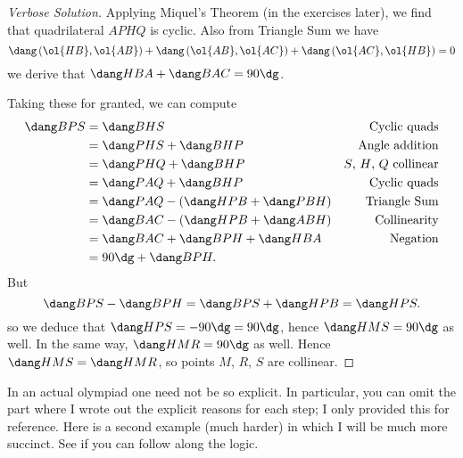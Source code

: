 \documentclass[11pt]{scrartcl}
\begin{document}
\begin{proof}
  [Verbose Solution]
  Applying Miquel's Theorem (in the exercises later),
  we find that quadrilateral $APHQ$ is cyclic.
  Also from Triangle Sum we have
  \[ \dang \left( \ol{HB}, \ol{AB} \right)
    + \dang \left( \ol{AB}, \ol{AC} \right)
    + \dang \left( \ol{AC}, \ol{HB} \right)
    = 0 \]
   we derive that $\dang HBA + \dang BAC = 90\dg$.

  Taking these for granted,
  we can compute
  \begin{align*}
    \dang BPS &= \dang BHS & \text{Cyclic quads} \\
    &= \dang PHS + \dang BHP & \text{Angle addition} \\
    &= \dang PHQ + \dang BHP & \text{$S$, $H$, $Q$ collinear} \\
    &= \dang PAQ + \dang BHP & \text{Cyclic quads} \\
    &= \dang PAQ - (\dang HPB + \dang PBH) & \text{Triangle Sum} \\
    &= \dang BAC - (\dang HPB + \dang ABH) & \text{Collinearity} \\
    &= \dang BAC + \dang BPH + \dang HBA & \text{Negation} \\
    &= 90\dg + \dang BPH. &
  \end{align*}
  But \[ \dang BPS - \dang BPH
    = \dang BPS + \dang HPB = \dang HPS. \]
  so we deduce that $\dang HPS = -90\dg = 90\dg$,
  hence $\dang HMS = 90\dg$ as well.
  In the same way, $\dang HMR = 90\dg$ as well.
  Hence $\dang HMS = \dang HMR$, so points $M$, $R$, $S$ are collinear.
\end{proof}
In an actual olympiad one need not be so explicit.
In particular, you can omit the part where I wrote out the explicit reasons
for each step; I only provided this for reference.
Here is a second example (much harder) in which I will be much more succinct.
See if you can follow along the logic.
\end{document}
